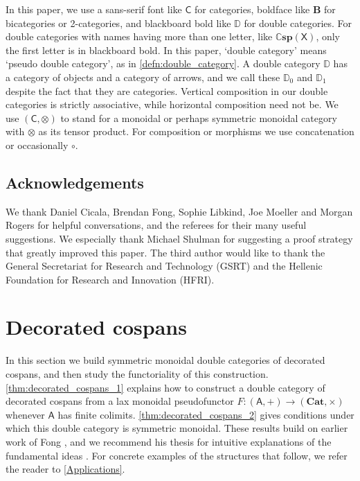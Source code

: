 \documentclass[ a4paper, onecolumn, superscriptaddress,10pt, accepted=2022-02-14, issue=3, volume=4, shorttitle=papers/compositionality-4-3 ]{compositionalityarticle}
\let\maps\colon
\newcommand{\A}{\mathsf{A}}
\newcommand{\C}{\mathsf{C}}
\newcommand{\X}{\mathsf{X}}
\newcommand{\bicat}{\mathbf}
\newcommand{\Cat}{\bicat{Cat}}
\newcommand{\double}[1]{\mathbf{\mathbb #1}}
\newcommand{\lCsp}{\double{Csp}}
\newcommand{\lD}{\double{D}}
\begin{document}
In this paper, we use a sans-serif font like $\C$ for categories, boldface like $\mathbf{B}$ for bicategories or 2-categories, and blackboard bold like $\lD$ for double categories. For double categories with names having more than one letter, like $\lCsp(\X)$, only the first letter is in
blackboard bold. In this paper, `double category' means `pseudo double category', as in \cref{defn:double_category}. A double category $\lD$ has a category of objects and a category of arrows, and we call these $\lD_0$ and $\lD_1$ despite the fact that they are categories. Vertical composition in our double categories is strictly associative, while horizontal composition need not be.  We use $(\C,\otimes)$ to stand for a monoidal or perhaps symmetric monoidal category with $\otimes$ as its tensor product.  For composition or morphisms we use concatenation or occasionally $\circ$.

\subsection*{Acknowledgements}

We thank Daniel Cicala, Brendan Fong, Sophie Libkind, Joe Moeller and Morgan Rogers for helpful conversations, and the referees for their many useful suggestions.  We especially thank Michael Shulman for suggesting a proof strategy that greatly improved this paper.   The third author would like to thank the General Secretariat for Research  and Technology (GSRT) and the Hellenic Foundation for Research and Innovation (HFRI).

\section{Decorated cospans}\label{DecCospansDoubleCat}

In this section we build symmetric monoidal double categories of decorated cospans, and then study the functoriality of this construction.
\cref{thm:decorated_cospans_1} explains how to construct a double category of decorated cospans from a lax monoidal pseudofunctor $F \maps (\A,+) \to
(\Cat, \times)$ whenever $\A$ has finite colimits.  \cref{thm:decorated_cospans_2} gives conditions under which this double category is symmetric
monoidal.   These results build on earlier work of Fong \cite{Fong}, and we recommend his thesis for intuitive explanations of the fundamental ideas
\cite{FongThesis}. For concrete examples of the structures that follow, we refer the reader to \cref{Applications}.
\end{document}
